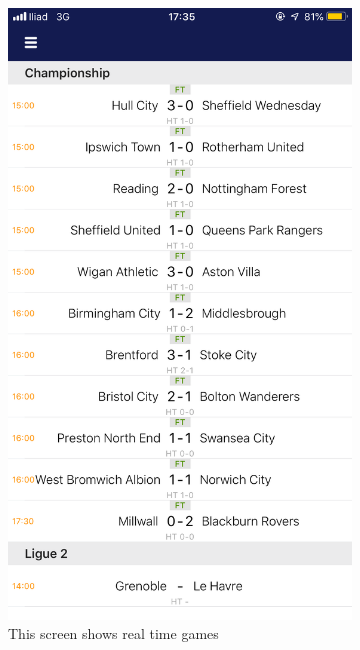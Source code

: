 \documentclass[numbers=noenddot, 12pt, a4paper, oneside]{scrbook}
\begin{document}
\begin{figure}[H]
	\begin{subfigure}{.5\textwidth}
		\centering
		\includegraphics[width=.8\linewidth]{images/Screen/Live}
		\caption{This screen shows real time games}
	\end{subfigure}
	\begin{subfigure}{.5\textwidth}
		\centering

\end{subfigure}
\end{figure}
\end{document}
